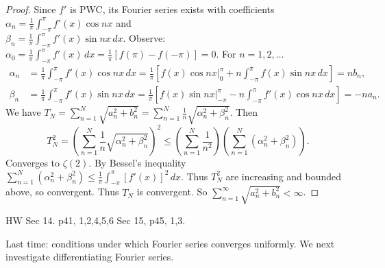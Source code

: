 \documentclass[]{article}
\begin{document}
\begin{proof}
	Since $f'$ is PWC, its Fourier series exists with coefficients $\alpha_n = \frac{1}{\pi}\int_{-\pi}^\pi f'(x) \cos{nx}$ and \\ $\beta_n = \frac{1}{\pi} \int_{-\pi}^\pi f'(x) \sin{nx} \, dx$. Observe: $\alpha_0 = \frac{1}{\pi} \int_{-\pi}^\pi f'(x) \, dx = \frac{1}{\pi}[f(\pi)-f(-\pi)] = 0$.
	For $n=1,2,\dots$ \begin{align*}\alpha_n &= \frac{1}{\pi} \int_{-\pi}^\pi f'(x) \cos{nx} \,dx = \frac{1}{\pi} \left[ f(x)\cos{nx}\bigg\rvert_0^\pi + n\int_{-\pi}^\pi f(x)\sin{nx}\, dx \right] = nb_n, \\ \beta_n &= \frac{1}{\pi} \int_{-\pi}^\pi f'(x) \sin{nx} \, dx = \frac{1}{\pi} \left[ f(x)\sin{nx} \bigg\rvert_{-\pi}^\pi - n\int_{-\pi}^\pi f'(x)\cos{nx} \, dx \right] = -na_n. \end{align*}
	We have $T_N = \sum_{n=1}^N \sqrt{a_n^2 + b_n^2} = \sum_{n=1}^N \frac{1}{n}\sqrt{\alpha_n^2 + \beta_n^2}$. Then
	$$T_N^2 = \left(\sum_{n=1}^N \frac{1}{n}  \sqrt{\alpha_n^2 + \beta_n^2} \right)^2 \leq \left( \sum_{n=1}^N \frac{1}{n^2} \right) \left( \sum_{n=1}^N(\alpha_n^2 + \beta_n^2) \right).$$ Converges to $\zeta(2)$. By Bessel's inequality $\sum_{n=1}^N(\alpha_n^2 + \beta_n^2) \leq \frac{1}{\pi} \int_{-\pi}^\pi [f'(x)]^2 \, dx$.
	Thus $T_N^2$ are increasing and bounded above, so convergent. Thus $T_N$ is convergent. So $\sum_{n=1}^\infty \sqrt{a_n^2 + b_n^2}<\infty$.
\end{proof}
HW Sec 14. p41, 1,2,4,5,6
Sec 15, p45, 1,3.

Last time: conditions under which Fourier series converges uniformly.
We next investigate differentiating Fourier series.
\end{document}

